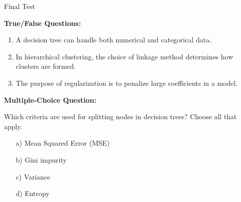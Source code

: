  \begin{center}\begin{large} Final Test
 \vspace{1em}
 
 \end{large}\end{center}
 \bigskip


\begin{problem} \textbf{True/False Questions:}

\begin{enumerate}
 
    \item A decision tree can handle both numerical and categorical data.

    \item In hierarchical clustering, the choice of linkage method determines how clusters are formed.

    \item The purpose of regularization is to penalize large coefficients in a model.


\end{enumerate}
    
\end{problem} 



\begin{problem} \textbf{Multiple-Choice Question:}

\item Which criteria are used for splitting nodes in decision trees? Choose all that apply.

\begin{enumerate}
    \item [a)] Mean Squared Error (MSE)
    \item [b)] Gini impurity
    \item [c)] Variance
    \item [d)] Entropy
\end{enumerate}

\end{problem}


